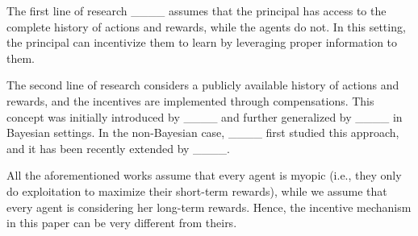     The first line of research ____ assumes that the principal has access to the complete history of actions and rewards, while the agents do not. In this setting, the principal can incentivize them to learn by leveraging proper information to them.
    
    The second line of research considers a publicly available history of actions and rewards, and the incentives are implemented through compensations. This concept was initially introduced by ____ and further generalized by ____ in Bayesian settings. In the non-Bayesian case,  ____ first studied this approach, and it has been recently extended by ____.
        
    

    All the aforementioned works assume that every agent is myopic (i.e., they only do exploitation to maximize their short-term rewards), while we assume that every agent is considering her long-term rewards. 
    Hence, the incentive mechanism in this paper can be very different from theirs. 
  


   
    
    
